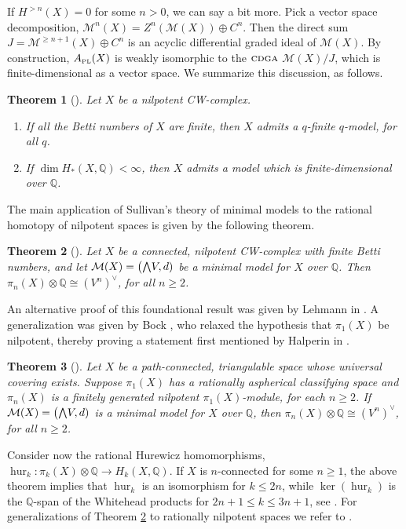 \documentclass{article}
\numberwithin{equation}{section}
\newtheorem{theorem}{Theorem}[section]
\theoremstyle{definition}
\newcommand{\Q}{\mathbb{Q}}
\newcommand{\M}{\mathcal{M}}
\newcommand{\cdga}{\ensuremath{\textsc{cdga}}}
\newcommand{\apl}{A_{\scriptscriptstyle{{\rm PL}}}}
\newcommand{\bwedge}{\mbox{\normalsize $\bigwedge$}}
\begin{document}
If $H^{>n}(X)=0$ for some $n>0$, we can say a bit more. Pick a vector 
space decomposition, $\M^n (X)= Z^{n}(\M (X)) \oplus C^{n}$.  Then  
the direct sum $J= \M^{\ge n+1}(X) \oplus C^n$ is an acyclic
differential graded ideal of $\M (X)$. By construction, 
$\apl (X)$ is weakly isomorphic to the $\cdga$ 
$\M (X)/J$, which is finite-dimensional as a vector space.  We 
summarize this discussion, as follows.

\begin{theorem}[\cite{Sullivan77}]
\label{thm:nilpsp}
Let $X$ be a nilpotent CW-complex. 
\begin{enumerate}
\item \label{nilp1} 
If all the Betti numbers of $X$ are finite, 
then $X$ admits a $q$-finite $q$-model, for all $q$.
\item  \label{nilp2}
If $\dim H_{*}(X, \Q)<\infty$, then $X$ admits a model which is 
finite-dimensional over $\Q$.
\end{enumerate}
\end{theorem}

The main application of Sullivan's theory of minimal models to the rational 
homotopy of nilpotent spaces is given by the following theorem. 

\begin{theorem}[\cite{Sullivan77}]
\label{thm:nilp-homotopy}
Let $X$ be a connected, nilpotent CW-complex with finite 
Betti numbers, and let $\M(X)=\big( \bwedge V, d)$ be a 
minimal model for $X$ over $\Q$. Then 
$\pi_n(X)\otimes \Q\cong (V^n)^{\vee}$, for all $n\ge 2$.
\end{theorem}

An alternative proof of this foundational result was given 
by Lehmann in \cite{Le}.  A generalization was given by 
Bock \cite{Bock}, who relaxed the hypothesis that 
$\pi_1(X)$ be nilpotent, thereby proving a statement 
first mentioned by Halperin in \cite{Hal83}. 

\begin{theorem}[\cite{Bock}]
\label{thm:nilp-homotopy-bis}
Let $X$ be a path-connected, triangulable space 
whose universal covering exists. Suppose $\pi_1(X)$ has a 
rationally aspherical classifying space and $\pi_n(X)$ is 
a finitely generated nilpotent $\pi_1(X)$-module, for each $n\ge 2$. 
If $\M(X)=\big( \bwedge V, d)$ is a minimal model for $X$ over 
$\Q$, then $\pi_n(X)\otimes \Q\cong (V^n)^{\vee}$, for all $n\ge 2$.
\end{theorem}

Consider now the rational Hurewicz homomorphisms,   
$\operatorname{hur}_k \colon \pi_{k}(X)\otimes \Q\to H_{k}(X,\Q)$. 
If $X$ is $n$-connected for some $n\ge 1$, 
the above theorem implies that 
 $\operatorname{hur}_k$ is an isomorphism for $k\le 2n$,  
while $\ker(\operatorname{hur}_k)$ is the $\Q$-span of 
 the Whitehead products for $2n+1\le k\le 3n+1$, see \cite{FH17}. 
For generalizations of Theorem \ref{thm:nilp-homotopy} 
to rationally nilpotent spaces we refer to \cite{FHT2}. 
\end{document}
